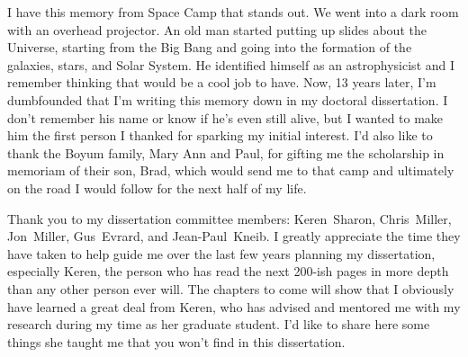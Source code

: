 I have this memory from Space Camp that stands out. We went into a dark room with an overhead projector. An old man started putting up slides about the Universe, starting from the Big Bang and going into the formation of the galaxies, stars, and Solar System. He identified himself as an astrophysicist and I remember thinking that would be a cool job to have. Now, 13 years later, I'm dumbfounded that I'm writing this memory down in my doctoral dissertation. I don't remember his name or know if he's even still alive, but I wanted to make him the first person I thanked for sparking my initial interest. I'd also like to thank the Boyum family, Mary Ann and Paul, for gifting me the scholarship in memoriam of their son, Brad, which would send me to that camp and ultimately on the road I would follow for the next half of my life.

Thank you to my dissertation committee members: Keren~Sharon, Chris~Miller, Jon~Miller, Gus~Evrard, and Jean-Paul~Kneib. I greatly appreciate the time they have taken to help guide me over the last few years planning my dissertation, especially Keren, the person who has read the next 200-ish pages in more depth than any other person ever will. The chapters to come will show that I obviously have learned a great deal from Keren, who has advised and mentored me with my research during my time as her graduate student. I'd like to share here some things she taught me that you won't find in this dissertation.

